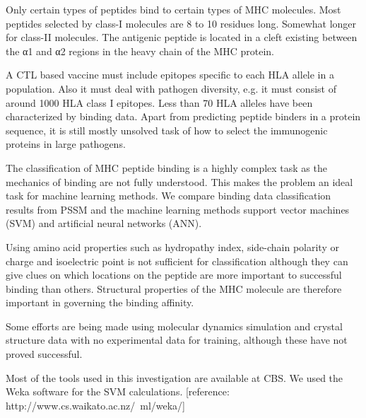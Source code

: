 Only certain types of peptides bind to certain types of MHC molecules. Most peptides selected by class-I molecules are 8 to 10 residues long. 
Somewhat longer for class-II molecules. The antigenic peptide is located in a cleft existing between the α1 and α2 regions in the heavy chain of the MHC protein.

A CTL based vaccine must include epitopes specific to each HLA allele in a population. Also it must deal with pathogen diversity, e.g. it must consist of around 1000 HLA class I epitopes. 
Less than 70 HLA alleles have been characterized by binding data. Apart from predicting peptide binders in a protein sequence, it is still  mostly unsolved task of how to select the immunogenic proteins in large pathogens.

The classification of MHC peptide binding is a highly complex task as the mechanics of binding are not fully understood. 
This makes the problem an ideal task for machine learning methods. We compare binding data classification results from PSSM and the machine learning methods support vector machines (SVM) and artificial neural networks (ANN).

Using amino acid properties such as hydropathy index, side-chain polarity or charge and isoelectric point is not sufficient for classification although they can give clues on which locations on the peptide are more important to successful binding than others. 
Structural properties of the MHC molecule are therefore important in governing the binding affinity.

Some efforts are being made using molecular dynamics simulation and crystal structure data with no experimental data for training, although these have not proved successful.

Most of the tools used in this investigation are available at CBS. We used the Weka software for the SVM calculations. [reference: http://www.cs.waikato.ac.nz/~ml/weka/]
